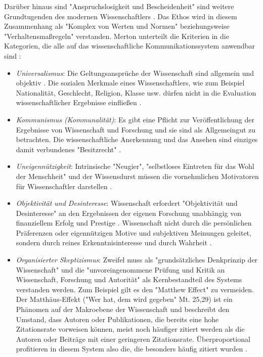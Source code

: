 Darüber hinaus sind "Anspruchslosigkeit und Bescheidenheit" sind weitere Grundtugenden des modernen Wissenschaftlers \cite{hagner_2015_sache_buches}. Das Ethos wird in diesem Zusammenhang als "Komplex von Werten und Normen" \cite{suchen} beziehungsweise "Verhaltensmaßregeln" \cite{suchen} verstanden. Merton unterteilt die Kriterien in die Kategorien, die alle auf das wissenschaftliche Kommunikationssystem anwendbar sind  \cite{Fröhlich_oa_2009}:
\begin{itemize}
\item \textit{Universalismus}: Die Geltungsansprüche der Wissenschaft sind allgemein und objektiv \cite{Oezmen_2015}. Die sozialen Merkmale eines Wissenschaftlers, wie zum Beispiel Nationalität, Geschlecht, Religion, Klasse usw. dürfen nicht in die Evaluation wissenschaftlicher Ergebnisse einfließen \cite{suchen}.
\item \textit{Kommunismus (Kommunalität)}: Es gibt eine Pflicht zur Veröffentlichung der Ergebnisse von Wissenschaft und Forschung und sie sind als Allgemeingut zu betrachten. Die wissenschaftliche Anerkennung und das Ansehen sind einziges damit verbundenes "Besitzrecht" \cite{suchen}.
\item \textit{Uneigennützigkeit}: Intrinsische "Neugier"\cite{suchen}, "selbstloses Eintreten für das Wohl der Menschheit"\cite{suchen} und der Wissensdurst müssen die vornehmlichen Motivatoren für Wissenschaftler darstellen \cite{suchen}.
\item \textit{Objektivität und Desinteresse}: Wissenschaft erfordert "Objektivität und Desinteresse" an den Ergebnissen der eigenen Forschung \cite{suchen} unabhängig von finanziellem Erfolg und Prestige \cite{suchen}. Wissenschaft nicht durch die persönlichen Präferenzen oder eigennützigen Motive und subjektiven Meinungen geleitet, sondern durch reines Erkenntnisinteresse und durch Wahrheit \cite{Oezmen_2015}.
\item \textit{Organisierter Skeptizismus}: Zweifel muss als "grundsätzliches Denkprinzip der Wissenschaft" \cite{suchen} und die "unvoreingenommene Prüfung und Kritik an Wissenschaft, Forschung und Autorität" \cite{suchen} als Kernbestandteil des Systems verstanden werden. Zum Beispiel gilt es den "Matthew Effect" zu vermeiden. Der Matthäus-Effekt ("Wer hat, dem wird gegeben" Mt. 25,29) ist ein Phänomen auf der Makroebene der Wissenschaft \cite{bonitz_1998_matthaus} und  beschreibt den Umstand, dass Autoren oder Publikationen, die bereits eine hohe Zitationsrate vorweisen können, meist noch häufiger zitiert werden als die Autoren oder Beiträge mit einer geringeren Zitationsrate. Überproportional profitieren in diesem System also die, die besonders häufig zitiert wurden \cite{Merton_1968} \cite{meier_2009_matthaus}.
\end{itemize}

